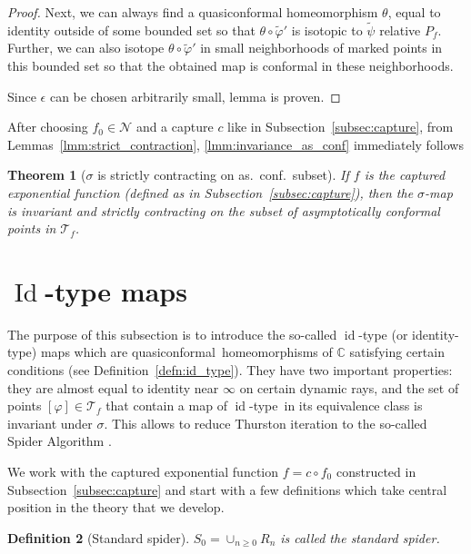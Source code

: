 \documentclass[10pt,reqno,a4paper]{amsart}
\numberwithin{figure}{section}
\numberwithin{equation}{section}
\newtheorem{thm}{Theorem}[section]
\newtheorem{defn}[thm]{Definition}
\newcommand{\qc}{quasiconformal}
\newcommand{\idt}{of $\id$-type}
\newcommand{\id}{\operatorname{id}}
\newcommand{\Id}{\operatorname{Id}}
\begin{document}
\begin{proof}
	Next, we can always find a quasiconformal homeomorphism $ \theta$, equal to identity outside of some bounded set so that $\theta\circ\tilde{\varphi}'$ is isotopic to $\tilde{\psi}$ relative $P_f$. Further, we can also isotope $\theta\circ\tilde{\varphi}'$ in small neighborhoods of marked points in this bounded set so that the obtained map is conformal in these neighborhoods.
	
	Since $ \epsilon $ can be chosen arbitrarily small, lemma is proven.
\end{proof}

After choosing $f_0\in\mathcal{N}$ and a capture $c$ like in Subsection~\ref{subsec:capture}, from Lemmas~\ref{lmm:strict_contraction}, \ref{lmm:invariance_as_conf} immediately follows

\begin{thm}[$\sigma$ is strictly contracting on as.\ conf.\ subset]
	\label{thm:sigma_strictly_contracting}
	If $f$ is the captured exponential function (defined as in Subsection~\ref{subsec:capture}), then the $\sigma$-map is invariant and strictly contracting on the subset of asymptotically conformal points in $\mathcal{T}_f$.
\end{thm}

\section{$\Id$-type maps}

\label{sec:id_type_maps}

The purpose of this subsection is to introduce the so-called $\id$-type (or identity-type) maps which are \qc\ homeomorphisms of $\mathbb{C}$ satisfying certain conditions (see Definition~\ref{defn:id_type}). They have two important properties: they are almost equal to identity near $\infty$ on certain dynamic rays, and the set of points $[\varphi]\in\mathcal{T}_f$ that contain a map \idt\ in its equivalence class is invariant under $\sigma$. This allows to reduce Thurston iteration to the so-called Spider Algorithm \cite{MarkusThesis,Spiders}.

We work with the captured exponential function $f=c\circ f_0$ constructed in Subsection~\ref{subsec:capture} and start with a few definitions which take central position in the theory that we develop.

\begin{defn}[Standard spider]
	$S_0=\cup_{n\geq 0} R_{n}$ is called the \emph{standard spider}.
\end{defn}
\end{document}
